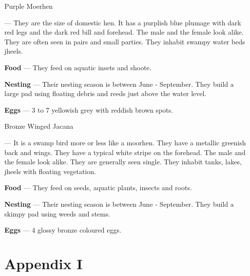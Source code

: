 \begin{bird}{Purple Moerhen}

 --- They are the size of domestic hen. It has a purplish blue plumage with dark red legs and the dark red bill and forehead. The male and the female look alike. They are often seen in pairs and small parties. They inhabit swampy water beds jheels.

{\large\bf Food} --- They feed on aquatic insets and shoote. 

{\large\bf Nesting} --- Their nesting season is between June - September. They build a large pad using floating debris and reeds just above the water level. 

{\large\bf Eggs} --- 3 to 7 yellowish grey with reddish brown spots.
\end{bird}

\newpage

\begin{bird}{Bronze Winged Jacana}

 --- It is a swamp bird more or less like a moorhen. They have a metallic greenish back and wings. They have a typical white stripe on the forehead. The male and the female look alike. They are generally seen single. They inhabit tanks, lakes, jheels with floating vegetation. 

{\large\bf Food} --- They feed on seeds, aquatic plants, insects and roots.

{\large\bf Nesting} --- Their nesting season is between June - September. They build a skimpy pad using weeds and stems.

{\large\bf Eggs} --- 4 glossy bronze coloured eggs.
\end{bird}



\chapter*{Appendix I}

